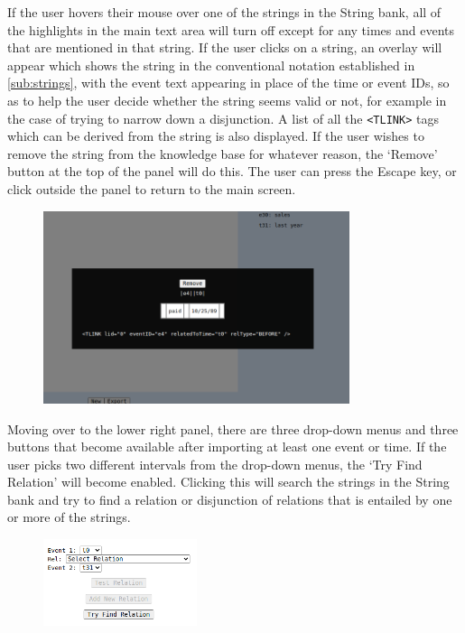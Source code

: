 \documentclass[a4paper,12pt,leqno]{article}
\begin{document}
If the user hovers their mouse over one of the strings in the String bank, all of the highlights in the main text area will turn off except for any times and events that are mentioned in that string. If the user clicks on a string, an overlay will appear which shows the string in the conventional notation established in \cref{sub:strings}, with the event text appearing in place of the time or event IDs, so as to help the user decide whether the string seems valid or not, for example in the case of trying to narrow down a disjunction. A list of all the \verb|<TLINK>| tags which can be derived from the string is also displayed. If the user wishes to remove the string from the knowledge base for whatever reason, the `Remove' button at the top of the panel will do this. The user can press the Escape key, or click outside the panel to return to the main screen.
\begin{center}
	\begin{figure}[h!]
		\centering
		\includegraphics[width=0.8\textwidth]{images/START-clicked-string.png}
	\end{figure}
\end{center}
Moving over to the lower right panel, there are three drop-down menus and three buttons that become available after importing at least one event or time. If the user picks two different intervals from the drop-down menus, the `Try Find Relation' will become enabled. Clicking this will search the strings in the String bank and try to find a relation or disjunction of relations that is entailed by one or more of the strings.
\begin{center}
	\begin{figure}[h!]
		\centering
		\includegraphics[width=0.4\textwidth]{images/START-try-1.png}
	\end{figure}
\end{center}
\end{document}
